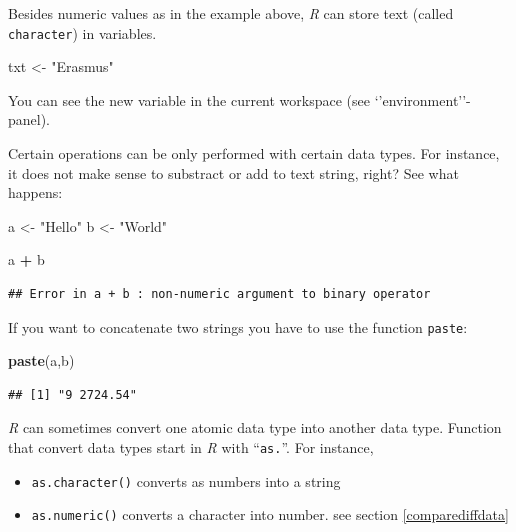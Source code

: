 \documentclass[
]{scrartcl}
\makeatletter
\newenvironment{Shaded}{\begin{snugshade}}{\end{snugshade}}
\newcommand{\KeywordTok}[1]{\textcolor[rgb]{0.13,0.29,0.53}{\textbf{#1}}}
\newcommand{\NormalTok}[1]{#1}
\newcommand{\OperatorTok}[1]{\textcolor[rgb]{0.81,0.36,0.00}{\textbf{#1}}}
\newcommand{\StringTok}[1]{\textcolor[rgb]{0.31,0.60,0.02}{#1}}
\providecommand{\tightlist}{%
  \setlength{\itemsep}{0pt}\setlength{\parskip}{0pt}}
\newenvironment{kframe}{%
\medskip{}
\setlength{\fboxsep}{.8em}
 \def\at@end@of@kframe{}%
 \ifinner\ifhmode%
  \def\at@end@of@kframe{\end{minipage}}%
  \begin{minipage}{\columnwidth}%
 \fi\fi%
 \def\FrameCommand##1{\hskip\@totalleftmargin \hskip-\fboxsep
 \colorbox{shadecolor}{##1}\hskip-\fboxsep
     \hskip-\linewidth \hskip-\@totalleftmargin \hskip\columnwidth}%
 \MakeFramed {\advance\hsize-\width
   \@totalleftmargin\z@ \linewidth\hsize
   \@setminipage}}%
 {\par\unskip\endMakeFramed%
 \at@end@of@kframe}
\newenvironment{rmdblock}[1]
  {
  \begin{itemize}
  \renewcommand{\labelitemi}{
    \raisebox{-.7\height}[0pt][0pt]{
      {\setkeys{Gin}{width=3em,keepaspectratio}\texttt{[image: images/\#1]}}
    }
  }
  \setlength{\fboxsep}{1em}
  \begin{kframe}
  \item
  }
  {
  \end{kframe}
  \end{itemize}
  }
\newenvironment{important}
    {\begin{rmdblock}{hint}}
    {\end{rmdblock}}
\makeatother
\begin{document}
Besides numeric values as in the example above, \emph{R} can store text (called \texttt{character}) in variables.

\begin{Shaded}
\begin{Highlighting}[]
\NormalTok{txt \textless{}{-}}\StringTok{ "Erasmus"}
\end{Highlighting}
\end{Shaded}

You can see the new variable in the current workspace (see `'environment''-panel).

Certain operations can be only performed with certain data types. For instance,
it does not make sense to substract or add to text string, right? See what happens:

\begin{Shaded}
\begin{Highlighting}[]
\NormalTok{a \textless{}{-}}\StringTok{ "Hello"}
\NormalTok{b \textless{}{-}}\StringTok{ "World"}
\end{Highlighting}
\end{Shaded}

\begin{Shaded}
\begin{Highlighting}[]
\NormalTok{a }\OperatorTok{+}\StringTok{ }\NormalTok{b}
\end{Highlighting}
\end{Shaded}

\begin{verbatim}
## Error in a + b : non-numeric argument to binary operator
\end{verbatim}

If you want to concatenate two strings you have to use the function \texttt{paste}:

\begin{Shaded}
\begin{Highlighting}[]
\KeywordTok{paste}\NormalTok{(a,b)}
\end{Highlighting}
\end{Shaded}

\begin{verbatim}
## [1] "9 2724.54"
\end{verbatim}

\begin{important}
\emph{R} can sometimes convert one atomic data type into another data
type. Function that convert data types start in \emph{R} with
``\texttt{as.}''. For instance,

\begin{itemize}
\tightlist
\item
  \texttt{as.character()} converts as numbers into a string
\item
  \texttt{as.numeric()} converts a character into number. see section
  \ref{comparediffdata}
\end{itemize}
\end{important}
\end{document}
